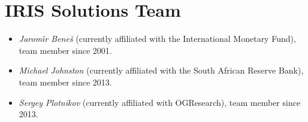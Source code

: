 
\section*{IRIS Solutions Team}

\begin{itemize}

\item \textit{Jarom\'\i r Bene\v s} (currently affiliated with the International Monetary Fund), team member since 2001.

\item \textit{Michael Johnston} (currently affiliated with the South African Reserve Bank), team member since 2013.

\item \textit{Sergey Plotnikov} (currently affiliated with OGResearch), team member since 2013.

\end{itemize}